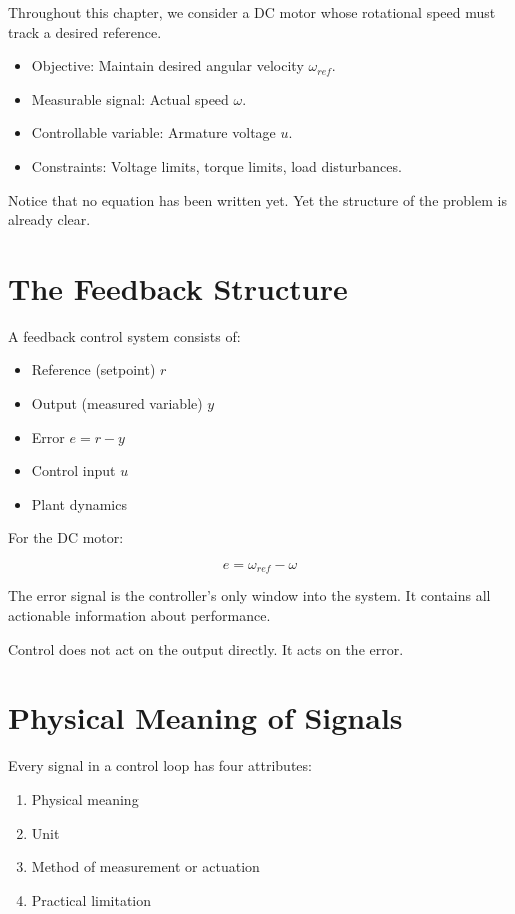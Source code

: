 Throughout this chapter, we consider a DC motor whose rotational speed must track a desired reference.

\begin{itemize}
	\item Objective: Maintain desired angular velocity $\omega_{ref}$.
	\item Measurable signal: Actual speed $\omega$.
	\item Controllable variable: Armature voltage $u$.
	\item Constraints: Voltage limits, torque limits, load disturbances.
\end{itemize}

Notice that no equation has been written yet.
Yet the structure of the problem is already clear.

\section{The Feedback Structure}

A feedback control system consists of:

\begin{itemize}
	\item Reference (setpoint) $r$
	\item Output (measured variable) $y$
	\item Error $e = r - y$
	\item Control input $u$
	\item Plant dynamics
\end{itemize}

For the DC motor:

\[
e = \omega_{ref} - \omega
\]

The error signal is the controller’s only window into the system.
It contains all actionable information about performance.

Control does not act on the output directly.
It acts on the error.

\section{Physical Meaning of Signals}

Every signal in a control loop has four attributes:

\begin{enumerate}
	\item Physical meaning
	\item Unit
	\item Method of measurement or actuation
	\item Practical limitation
\end{enumerate}

